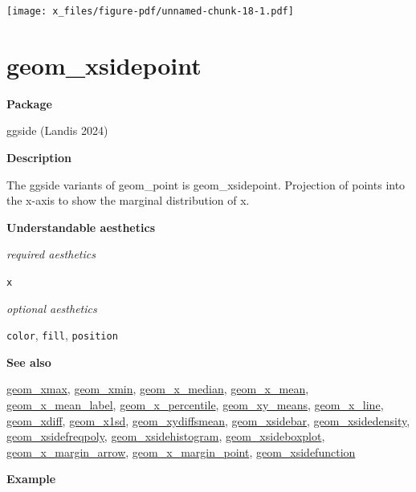 \documentclass[
  letterpaper,
  DIV=11,
  numbers=noendperiod]{scrreprt}
\begin{document}
\texttt{[image: x\_files/figure-pdf/unnamed-chunk-18-1.pdf]}

\section{geom\_xsidepoint}\label{xsidepoint}

\textbf{Package}

ggside (Landis 2024)

\textbf{Description}

The ggside variants of geom\_point is geom\_xsidepoint. Projection of
points into the x-axis to show the marginal distribution of x.

\textbf{Understandable aesthetics}

\emph{required aesthetics}

\texttt{x}

\emph{optional aesthetics}

\texttt{color}, \texttt{fill}, \texttt{position}

\textbf{See also}

\href{@xmax}{geom\_xmax}, \href{@xmin}{geom\_xmin},
\href{@x_median}{geom\_x\_median}, \href{@x_mean}{geom\_x\_mean},
\href{@x_mean_label}{geom\_x\_mean\_label},
\href{@x_percentile}{geom\_x\_percentile},
\href{@xy_means}{geom\_xy\_means}, \href{@x_line}{geom\_x\_line},
\href{@xdiff}{geom\_xdiff}, \href{@x1sd}{geom\_x1sd},
\href{@xydiffsmean}{geom\_xydiffsmean},
\href{@xsidebar}{geom\_xsidebar},
\href{@xsidedensity}{geom\_xsidedensity},
\href{@xsidefreqpoly}{geom\_xsidefreqpoly},
\href{@xsidehistogram}{geom\_xsidehistogram},
\href{@xsideboxplot}{geom\_xsideboxplot},
\href{@x_margin_arrow}{geom\_x\_margin\_arrow},
\href{@x_margin_point}{geom\_x\_margin\_point},
\href{@xsidefunction}{geom\_xsidefunction}

\textbf{Example}
\end{document}
